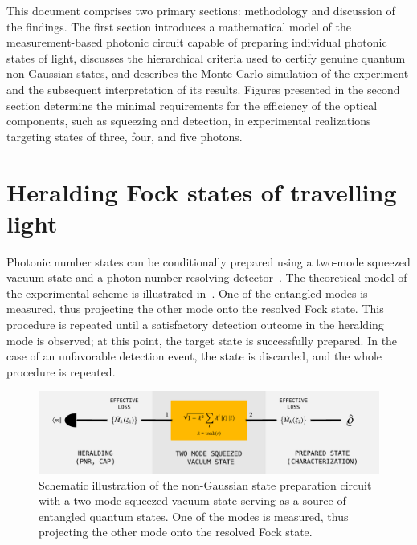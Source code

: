 \documentclass{optica-article}
\begin{document}
This document comprises two primary sections:  methodology and discussion of the findings. The first section introduces a mathematical model of the measurement-based photonic circuit capable of preparing individual photonic states of light, discusses the hierarchical criteria used to certify genuine quantum non-Gaussian states, and describes the Monte Carlo simulation of the experiment and the subsequent interpretation of its results. Figures presented in the second section determine the minimal requirements for the efficiency of the optical components, such as squeezing and detection, in experimental realizations targeting states of three, four, and five photons.

%

\section{Heralding Fock states of travelling light}

Photonic number states can be conditionally prepared using a two-mode squeezed vacuum state and a photon number resolving detector~\cite{yukawa2013a,yoshikawa2018,tiedau2019,provaznik2020}. The theoretical model of the experimental scheme is illustrated in~. One of the entangled modes is measured, thus projecting the other mode onto the resolved Fock state. This procedure is repeated until a satisfactory detection outcome in the heralding mode is observed; at this point, the target state is successfully prepared. In the case of an unfavorable detection event, the state is discarded, and the whole procedure is repeated.

\begin{figure}[h]
  \begin{center}
    \includegraphics[width = 1.00 \columnwidth]{import/illustrate_scheme_alt.pdf}
  \end{center}
  \caption{
    Schematic illustration of the non-Gaussian state preparation circuit with a two mode squeezed vacuum state serving as a source of entangled quantum states. One of the modes is measured, thus projecting the other mode onto the resolved Fock state. 
  }
  \label{f-scheme}
\end{figure}
\end{document}
